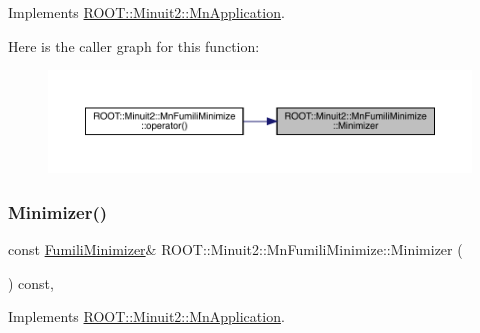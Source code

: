 Implements \mbox{\hyperlink{classROOT_1_1Minuit2_1_1MnApplication_a5a8e1e2658b731b5f4023dd1b1594223}{R\+O\+O\+T\+::\+Minuit2\+::\+Mn\+Application}}.

Here is the caller graph for this function\+:
\nopagebreak
\begin{figure}[H]
\begin{center}
\leavevmode
\includegraphics[width=350pt]{dc/d88/classROOT_1_1Minuit2_1_1MnFumiliMinimize_a96eb0cf96ae7ec874f912b6d2b3e7990_icgraph}
\end{center}
\end{figure}
\mbox{\label{classROOT_1_1Minuit2_1_1MnFumiliMinimize_a96eb0cf96ae7ec874f912b6d2b3e7990}} 
\subsubsection{\texorpdfstring{Minimizer()}{Minimizer()}\hspace{0.1cm}{\footnotesize\ttfamily [3/3]}}
{\footnotesize\ttfamily const \mbox{\hyperlink{classROOT_1_1Minuit2_1_1FumiliMinimizer}{Fumili\+Minimizer}}\& R\+O\+O\+T\+::\+Minuit2\+::\+Mn\+Fumili\+Minimize\+::\+Minimizer (\begin{DoxyParamCaption}{ }\end{DoxyParamCaption}) const\hspace{0.3cm}{\ttfamily [inline]}, {\ttfamily [virtual]}}



Implements \mbox{\hyperlink{classROOT_1_1Minuit2_1_1MnApplication_a5a8e1e2658b731b5f4023dd1b1594223}{R\+O\+O\+T\+::\+Minuit2\+::\+Mn\+Application}}.

\mbox{\label{classROOT_1_1Minuit2_1_1MnFumiliMinimize_a58da42cb9def0b42c424a3121987e77b}} 
